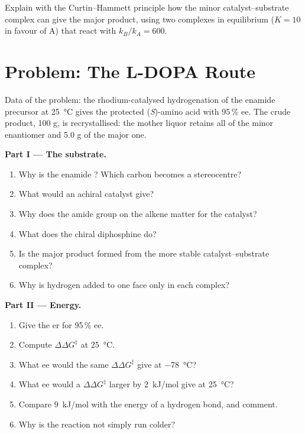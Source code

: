\begin{exercise}[$\star\star\star$]\label{exo:b3:asymmetric-synthesis:12}
Explain with the Curtin--Hammett principle how the minor catalyst--substrate
complex can give the major product, using two complexes in equilibrium
($K = 10$ in favour of A) that react with $k_B/k_A = 600$.
\end{exercise}

\section{Problem: The L-DOPA Route}

\begin{problem}
\label{pb:b3:asymmetric-synthesis:1}
Data of the problem: the rhodium-catalysed hydrogenation of the enamide
precursor at \qty{25}{\celsius} gives the protected (\textit{S})-amino acid with 95\,\% ee. The crude
product, 100 g, is recrystallised: the mother liquor retains all of the minor
enantiomer and 5.0 g of the major one.

\medskip\noindent\textbf{Part I --- The substrate.}
\begin{enumerate}
  \item Why is the enamide ? Which carbon becomes a stereocentre?
  \item What would an achiral catalyst give?
  \item Why does the amide group on the alkene matter for the catalyst?
  \item What does the chiral diphosphine do?
  \item Is the major product formed from the more stable catalyst--substrate
        complex?
  \item Why is hydrogen added to one face only in each complex?
\end{enumerate}

\medskip\noindent\textbf{Part II --- Energy.}
\begin{enumerate}[resume]
  \item Give the er for 95\,\% ee.
  \item Compute $\Delta\Delta G^\ddagger$ at \qty{25}{\celsius}.
  \item What ee would the same $\Delta\Delta G^\ddagger$ give at \qty{-78}{\celsius}?
  \item What ee would a $\Delta\Delta G^\ddagger$ larger by \qty{2}{kJ/mol} give at \qty{25}{\celsius}?
  \item Compare \qty{9}{kJ/mol} with the energy of a hydrogen bond, and comment.
  \item Why is the reaction not simply run colder?
\end{enumerate}


\end{problem}
